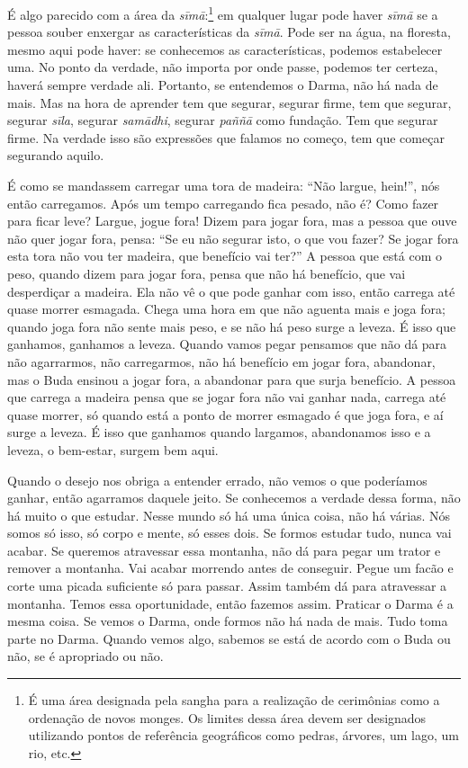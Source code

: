 É algo parecido com a área da \textit{sīmā}:\footnote{É uma área
designada pela sangha para a realização de cerimônias como a ordenação
de novos monges. Os limites dessa área devem ser designados utilizando
pontos de referência geográficos como pedras, árvores, um lago, um rio,
etc.} em qualquer lugar pode haver \textit{sīmā} se a pessoa
souber enxergar as características da \textit{sīmā}. Pode ser na
água, na floresta, mesmo aqui pode haver: se conhecemos as
características, podemos estabelecer uma. No ponto da verdade, não
importa por onde passe, podemos ter certeza, haverá sempre verdade ali.
Portanto, se entendemos o Darma, não há nada de mais. Mas na hora de
aprender tem que segurar, segurar firme, tem que segurar, segurar
\textit{sīla}, segurar \textit{samādhi}, segurar \textit{paññā}
como fundação. Tem que segurar firme. Na verdade isso são expressões
que falamos no começo, tem que começar segurando aquilo. 

É como se mandassem carregar uma tora de madeira: “Não largue,
hein!”, nós então carregamos. Após um tempo carregando fica pesado, não
é? Como fazer para ficar leve? Largue, jogue fora! Dizem para jogar
fora, mas a pessoa que ouve não quer jogar fora, pensa: “Se eu não
segurar isto, o que vou fazer? Se jogar fora esta tora não vou ter
madeira, que benefício vai ter?” A pessoa que está com o peso, quando
dizem para jogar fora, pensa que não há benefício, que vai desperdiçar
a madeira. Ela não vê o que pode ganhar com isso, então carrega até
quase morrer esmagada. Chega uma hora em que não aguenta mais e joga
fora; quando joga fora não sente mais peso, e se não há peso surge a
leveza. É isso que ganhamos, ganhamos a leveza. Quando vamos pegar
pensamos que não dá para não agarrarmos, não carregarmos, não há
benefício em jogar fora, abandonar, mas o Buda ensinou a jogar fora, a
abandonar para que surja benefício. A pessoa que carrega a madeira
pensa que se jogar fora não vai ganhar nada, carrega até quase morrer,
só quando está a ponto de morrer esmagado é que joga fora, e aí surge a
leveza. É isso que ganhamos quando largamos, abandonamos isso e a
leveza, o bem-estar, surgem bem aqui. 

Quando o desejo nos obriga a entender errado, não vemos o que
poderíamos ganhar, então agarramos daquele jeito. Se conhecemos a
verdade dessa forma, não há muito o que estudar. Nesse mundo só há uma
única coisa, não há várias. Nós somos só isso, só corpo e mente, só
esses dois. Se formos estudar tudo, nunca vai acabar. Se queremos
atravessar essa montanha, não dá para pegar um trator e remover a
montanha. Vai acabar morrendo antes de conseguir. Pegue um facão e
corte uma picada suficiente só para passar. Assim também dá para
atravessar a montanha. Temos essa oportunidade, então fazemos assim.
Praticar o Darma é a mesma coisa. Se vemos o Darma, onde formos não há
nada de mais. Tudo toma parte no Darma. Quando vemos algo, sabemos se
está de acordo com o Buda ou não, se é apropriado ou não. 

